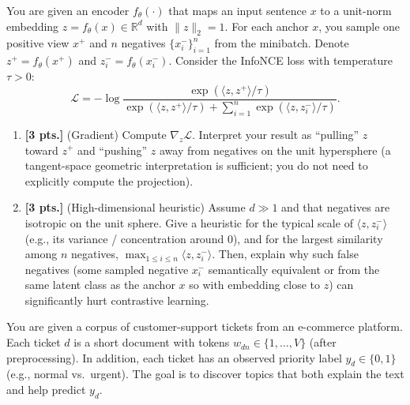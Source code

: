 \documentclass[11pt,a4paper]{article}
\newcommand{\examstatement}[1]{%
  \par\addvspace{0.85em}%
  \noindent{\bfseries #1}\par\nobreak\addvspace{0.28em}%
}
\begin{document}
\par

\examstatement{Problem 1. [6 pts.]}
You are given an encoder $f_{\theta}(\cdot)$ that maps an input sentence $x$ to a unit-norm embedding $z = f_{\theta}(x) \in \mathbb{R}^{d}$ with $\|z\|_{2} = 1$. For each anchor $x$, you sample one positive view $x^{+}$ and $n$ negatives $\{x_{i}^{-}\}_{i=1}^{n}$ from the minibatch. Denote $z^{+} = f_{\theta}(x^{+})$ and $z_{i}^{-} = f_{\theta}(x_{i}^{-})$. Consider the InfoNCE loss with temperature $\tau > 0$:
\[
\mathcal{L} = -\log \frac{\exp(\langle z, z^{+} \rangle / \tau)}{\exp(\langle z, z^{+} \rangle / \tau) + \sum_{i=1}^{n} \exp(\langle z, z_{i}^{-} \rangle / \tau)}.
\]
\begin{enumerate}[label=(\alph*)]
    \item \textbf{[3 pts.]} (Gradient) Compute $\nabla_z \mathcal{L}$. Interpret your result as ``pulling'' $z$ toward $z^{+}$ and ``pushing'' $z$ away from negatives on the unit hypersphere (a tangent-space geometric interpretation is sufficient; you do not need to explicitly compute the projection).
    \item \textbf{[3 pts.]} (High-dimensional heuristic) Assume $d \gg 1$ and that negatives are isotropic on the unit sphere. Give a heuristic for the typical scale of $\langle z, z_{i}^{-} \rangle$ (e.g., its variance / concentration around $0$), and for the largest similarity among $n$ negatives, $\max_{1 \le i \le n} \langle z, z_{i}^{-} \rangle$. Then, explain why such false negatives (some sampled negative $x_{i}^{-}$ semantically equivalent or from the same latent class as the anchor $x$ so with embedding close to $z$) can significantly hurt contrastive learning.
\end{enumerate}

\examstatement{Problem 2. [6 pts.]}
You are given a corpus of customer-support tickets from an e-commerce platform. Each ticket $d$ is a short document with tokens $w_{dn} \in \{1, \dots, V\}$ (after preprocessing). In addition, each ticket has an observed priority label $y_d \in \{0, 1\}$ (e.g., normal vs.\ urgent). The goal is to discover topics that both explain the text and help predict $y_d$.
\end{document}
